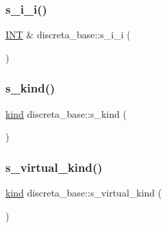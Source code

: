 \mbox{\label{classdiscreta__base_aadb92c01fbe69b3034b0214b33fbc735}} 
\subsubsection{\texorpdfstring{s\+\_\+i\+\_\+i()}{s\_i\_i()}}
{\footnotesize\ttfamily \mbox{\hyperlink{galois_8h_a09fddde158a3a20bd2dcadb609de11dc}{I\+NT}} \& discreta\+\_\+base\+::s\+\_\+i\+\_\+i (\begin{DoxyParamCaption}{ }\end{DoxyParamCaption})}

\mbox{\label{classdiscreta__base_a8a830025c74adbbc3362418a7c2ba157}} 
\subsubsection{\texorpdfstring{s\+\_\+kind()}{s\_kind()}}
{\footnotesize\ttfamily \mbox{\hyperlink{discreta_8h_aaf25ee7e2306d78c74ec7bc48f092e81}{kind}} discreta\+\_\+base\+::s\+\_\+kind (\begin{DoxyParamCaption}{ }\end{DoxyParamCaption})}

\mbox{\label{classdiscreta__base_a52778a6d6943a468be083d0785d418fb}} 
\subsubsection{\texorpdfstring{s\+\_\+virtual\+\_\+kind()}{s\_virtual\_kind()}}
{\footnotesize\ttfamily \mbox{\hyperlink{discreta_8h_aaf25ee7e2306d78c74ec7bc48f092e81}{kind}} discreta\+\_\+base\+::s\+\_\+virtual\+\_\+kind (\begin{DoxyParamCaption}{ }\end{DoxyParamCaption})\hspace{0.3cm}{\ttfamily [virtual]}}



